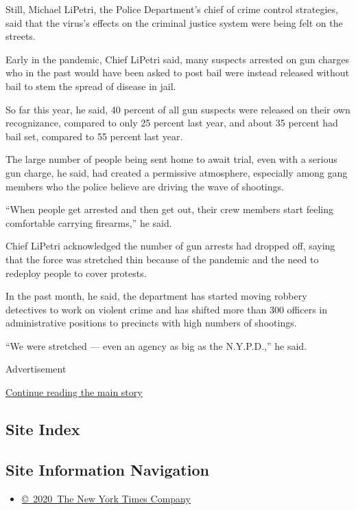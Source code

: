 Still, Michael LiPetri, the Police Department's chief of crime control
strategies, said that the virus's effects on the criminal justice system
were being felt on the streets.

Early in the pandemic, Chief LiPetri said, many suspects arrested on gun
charges who in the past would have been asked to post bail were instead
released without bail to stem the spread of disease in jail.

So far this year, he said, 40 percent of all gun suspects were released
on their own recognizance, compared to only 25 percent last year, and
about 35 percent had bail set, compared to 55 percent last year.

The large number of people being sent home to await trial, even with a
serious gun charge, he said, had created a permissive atmosphere,
especially among gang members who the police believe are driving the
wave of shootings.

``When people get arrested and then get out, their crew members start
feeling comfortable carrying firearms,'' he said.

Chief LiPetri acknowledged the number of gun arrests had dropped off,
saying that the force was stretched thin because of the pandemic and the
need to redeploy people to cover protests.

In the past month, he said, the department has started moving robbery
detectives to work on violent crime and has shifted more than 300
officers in administrative positions to precincts with high numbers of
shootings.

``We were stretched --- even an agency as big as the N.Y.P.D.,'' he
said.

Advertisement

\protect\hyperlink{after-bottom}{Continue reading the main story}

\hypertarget{site-index}{%
\subsection{Site Index}\label{site-index}}

\hypertarget{site-information-navigation}{%
\subsection{Site Information
Navigation}\label{site-information-navigation}}

\begin{itemize}
\tightlist
\item
  \href{https://help.nytimes.com/hc/en-us/articles/115014792127-Copyright-notice}{©~2020~The
  New York Times Company}
\end{itemize}

